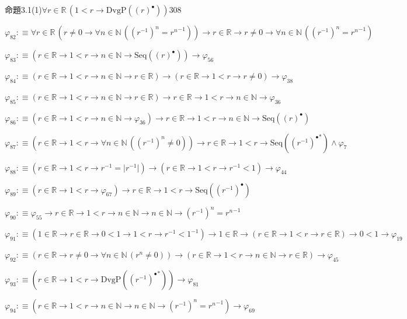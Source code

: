 \begin{fullproof}{命題3.1(1)}{$\forall r \in \mathbb{R}\,(1 < r \to \mathrm{DvgP}({(r)^{\bullet}}))$}{308}
\begin{abbrevlist}
\item $\varphi_{82} :\equiv \forall r \in \mathbb{R}\,(r \neq 0 \to \forall n \in \mathbb{N}\,({{(r^{-1})}^{n}} = {{r}^{n}}^{-1})) \to r \in \mathbb{R} \to r \neq 0 \to \forall n \in \mathbb{N}\,({{(r^{-1})}^{n}} = {{r}^{n}}^{-1})$
\item $\varphi_{83} :\equiv (r \in \mathbb{R} \to 1 < r \to n \in \mathbb{N} \to \mathrm{Seq}({(r)^{\bullet}})) \to \varphi_{56}$
\item $\varphi_{84} :\equiv (r \in \mathbb{R} \to 1 < r \to n \in \mathbb{N} \to r \in \mathbb{R}) \to (r \in \mathbb{R} \to 1 < r \to r \neq 0) \to \varphi_{38}$
\item $\varphi_{85} :\equiv (r \in \mathbb{R} \to 1 < r \to n \in \mathbb{N} \to r \in \mathbb{R}) \to r \in \mathbb{R} \to 1 < r \to n \in \mathbb{N} \to \varphi_{36}$
\item $\varphi_{86} :\equiv (r \in \mathbb{R} \to 1 < r \to n \in \mathbb{N} \to \varphi_{36}) \to r \in \mathbb{R} \to 1 < r \to n \in \mathbb{N} \to \mathrm{Seq}({(r)^{\bullet}})$
\item $\varphi_{87} :\equiv (r \in \mathbb{R} \to 1 < r \to \forall n \in \mathbb{N}\,({{(r^{-1})}^{n}} \neq 0)) \to r \in \mathbb{R} \to 1 < r \to \mathrm{Seq}({(r^{-1})^{\bullet}}^{\ast}) \land \varphi_{7}$
\item $\varphi_{88} :\equiv (r \in \mathbb{R} \to 1 < r \to r^{-1} = \lvert r^{-1} \rvert) \to (r \in \mathbb{R} \to 1 < r \to r^{-1} < 1) \to \varphi_{44}$
\item $\varphi_{89} :\equiv (r \in \mathbb{R} \to 1 < r \to \varphi_{67}) \to r \in \mathbb{R} \to 1 < r \to \mathrm{Seq}({(r^{-1})^{\bullet}})$
\item $\varphi_{90} :\equiv \varphi_{55} \to r \in \mathbb{R} \to 1 < r \to n \in \mathbb{N} \to n \in \mathbb{N} \to {{(r^{-1})}^{n}} = {{r}^{n}}^{-1}$
\item $\varphi_{91} :\equiv (1 \in \mathbb{R} \to r \in \mathbb{R} \to 0 < 1 \to 1 < r \to r^{-1} < 1^{-1}) \to 1 \in \mathbb{R} \to (r \in \mathbb{R} \to 1 < r \to r \in \mathbb{R}) \to 0 < 1 \to \varphi_{19}$
\item $\varphi_{92} :\equiv (r \in \mathbb{R} \to r \neq 0 \to \forall n \in \mathbb{N}\,({{r}^{n}} \neq 0)) \to (r \in \mathbb{R} \to 1 < r \to n \in \mathbb{N} \to r \in \mathbb{R}) \to \varphi_{45}$
\item $\varphi_{93} :\equiv (r \in \mathbb{R} \to 1 < r \to \mathrm{DvgP}({(r^{-1})^{\bullet}}^{\ast})) \to \varphi_{81}$
\item $\varphi_{94} :\equiv (r \in \mathbb{R} \to 1 < r \to n \in \mathbb{N} \to n \in \mathbb{N} \to {{(r^{-1})}^{n}} = {{r}^{n}}^{-1}) \to \varphi_{69}$

\end{abbrevlist}
\end{fullproof}

